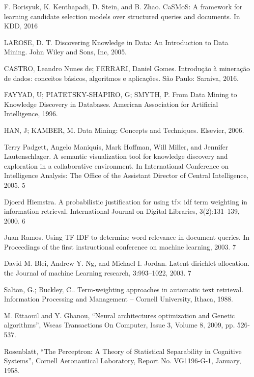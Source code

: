\documentclass[conference]{IEEEtran}
\begin{document}
\begin{thebibliography}

 F. Borisyuk, K. Kenthapadi, D. Stein, and B. Zhao. CaSMoS: A framework for
learning candidate selection models over structured queries and documents. In
KDD, 2016

 LAROSE, D. T. Discovering Knowledge in Data: An Introduction to Data Mining.
John Wiley and Sons, Inc, 2005.

 CASTRO, Leandro Nunes de; FERRARI, Daniel Gomes. Introdução à mineração de
dados: conceitos básicos, algoritmos e aplicações. São Paulo: Saraiva, 2016.

 FAYYAD, U; PIATETSKY-SHAPIRO, G; SMYTH, P. From Data Mining to Knowledge Discovery in Databases. American Association for Artificial Intelligence, 1996.

 HAN, J; KAMBER, M. Data Mining: Concepts and Techniques. Elsevier, 2006.

 Terry Padgett, Angelo Maniquis, Mark Hoffman, Will Miller, and Jennifer Lautenschlager. A semantic visualization tool for knowledge discovery and exploration in a
collaborative environment. In International Conference on Intelligence Analysis: The
Office of the Assistant Director of Central Intelligence, 2005. 5 

 Djoerd Hiemstra. A probabilistic justification for using tf$\times$ idf term weighting
in information retrieval. International Journal on Digital Libraries, 3(2):131–139,
2000. 6

 Juan Ramos. Using TF-IDF to determine word relevance in document queries.
In Proceedings of the first instructional conference on machine learning, 2003. 7

 David M. Blei, Andrew Y. Ng, and Michael I. Jordan. Latent dirichlet allocation.
the Journal of machine Learning research, 3:993–1022, 2003. 7

 Salton, G.; Buckley, C.. Term-weighting approaches in automatic text retrieval.
Information Processing and Management – Cornell University, Ithaca, 1988.

 M. Ettaouil and Y. Ghanou, “Neural architectures optimization and Genetic algorithms”, Wseas Transactions On Computer, Issue 3, Volume 8, 2009, pp. 526-537. 

 Rosenblatt, “The Perceptron: A Theory of Statistical Separability in Cognitive Systems”, Cornell Aeronautical Laboratory, Report No. VG1196-G-1, January, 1958. 


\end{thebibliography}
\end{document}
